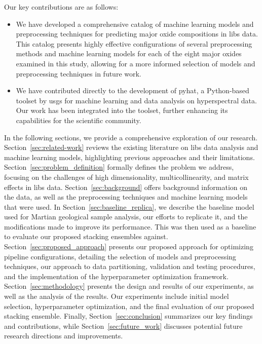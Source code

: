 Our key contributions are as follows:
\begin{itemize}
    \item We have developed a comprehensive catalog of machine learning models and preprocessing techniques for predicting major oxide compositions in \gls{libs} data. This catalog presents highly effective configurations of several preprocessing methods and machine learning models for each of the eight major oxides examined in this study, allowing for a more informed selection of models and preprocessing techniques in future work.
    \item We have contributed directly to the development of \gls{pyhat}, a Python-based toolset by \gls{usgs} for machine learning and data analysis on hyperspectral data. Our work has been integrated into the toolset, further enhancing its capabilities for the scientific community.
\end{itemize}

In the following sections, we provide a comprehensive exploration of our research.
Section~\ref{sec:related-work} reviews the existing literature on \gls{libs} data analysis and machine learning models, highlighting previous approaches and their limitations.
Section~\ref{sec:problem_definition} formally defines the problem we address, focusing on the challenges of high dimensionality, multicollinearity, and matrix effects in \gls{libs} data.
Section~\ref{sec:background} offers background information on the data, as well as the preprocessing techniques and machine learning models that were used.
In Section~\ref{sec:baseline_replica}, we describe the baseline model used for Martian geological sample analysis, our efforts to replicate it, and the modifications made to improve its performance.
This was then used as a baseline to evaluate our proposed stacking ensembles against.
Section~\ref{sec:proposed_approach} presents our proposed approach for optimizing pipeline configurations, detailing the selection of models and preprocessing techniques, our approach to data partitioning, validation and testing procedures, and the implementation of the hyperparameter optimization framework.
Section~\ref{sec:methodology} presents the design and results of our experiments, as well as the analysis of the results.
Our experiments include initial model selection, hyperparameter optimization, and the final evaluation of our proposed stacking ensemble.
Finally, Section~\ref{sec:conclusion} summarizes our key findings and contributions, while Section~\ref{sec:future_work} discusses potential future research directions and improvements.

